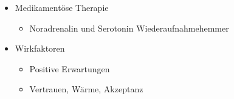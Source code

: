 \documentclass[11pt, paper=a4, twocolumn]{scrartcl}
\begin{document}
\begin{itemize}
		\item Medikamentöse Therapie
			\begin{itemize}	
				\item Noradrenalin und Serotonin Wiederaufnahmehemmer
			\end{itemize}

		\item Wirkfaktoren
			\begin{itemize}
				\item Positive Erwartungen
				\item Vertrauen, Wärme, Akzeptanz
			\end{itemize}

	\end{itemize}
\end{document}
